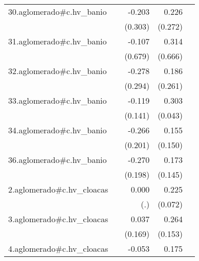 {\begin{longtable}{l*{4}{D{.}{.}{-1}}}
\addlinespace
30.aglomerado#c.hv\_banio&                     &      -0.203         &       0.226         &                     \\
            &                     &     (0.303)         &     (0.272)         &                     \\
\addlinespace
31.aglomerado#c.hv\_banio&                     &      -0.107         &       0.314         &                     \\
            &                     &     (0.679)         &     (0.666)         &                     \\
\addlinespace
32.aglomerado#c.hv\_banio&                     &      -0.278         &       0.186         &                     \\
            &                     &     (0.294)         &     (0.261)         &                     \\
\addlinespace
33.aglomerado#c.hv\_banio&                     &      -0.119         &       0.303\sym{***}&                     \\
            &                     &     (0.141)         &     (0.043)         &                     \\
\addlinespace
34.aglomerado#c.hv\_banio&                     &      -0.266         &       0.155         &                     \\
            &                     &     (0.201)         &     (0.150)         &                     \\
\addlinespace
36.aglomerado#c.hv\_banio&                     &      -0.270         &       0.173         &                     \\
            &                     &     (0.198)         &     (0.145)         &                     \\
\addlinespace
2.aglomerado#c.hv\_cloacas&                     &       0.000         &       0.225\sym{**} &                     \\
            &                     &         (.)         &     (0.072)         &                     \\
\addlinespace
3.aglomerado#c.hv\_cloacas&                     &       0.037         &       0.264         &                     \\
            &                     &     (0.169)         &     (0.153)         &                     \\
\addlinespace
4.aglomerado#c.hv\_cloacas&                     &      -0.053         &       0.175\sym{***}&                     \\

\end{longtable}}
